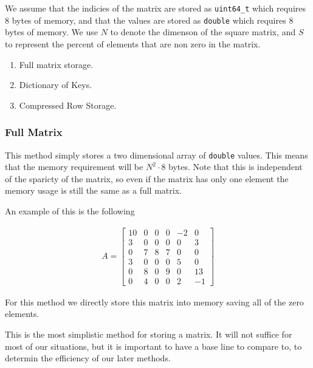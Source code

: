 \documentclass[../fem.tex]{subfiles}
\begin{document}
We assume that the indicies of the matrix are stored as
\texttt{uint64_t} which requires $8$ bytes of memory, and that the
values are stored as \texttt{double} which requires $8$ bytes of
memory. We use $N$ to denote the dimenson of the square matrix, and $S$ to
represent the percent of elements that are non zero in the matrix.

\begin{enumerate}[label=\arabic*.]
  \item Full matrix storage.
  \item Dictionary of Keys.
  \item Compressed Row Storage.
\end{enumerate}

\subsubsection{Full Matrix}%
\label{ssub:full_matrix}

This method simply stores a two dimensional array of \texttt{double}
values. This means that the memory requirement will be $N^2\cdot 8$ bytes. Note
that this is independent of the sparicty of the matrix, so even if the matrix
has only one element the memory usage is still the same as a full matrix.

An example of this is the following

\begin{align*}
   A = \begin{bmatrix}
     10 & 0 & 0 & 0 & -2 & 0 \\
     3 & 0 & 0 & 0 & 0 & 3 \\
     0 & 7 & 8 & 7 & 0 & 0 \\
     3 & 0 & 0 & 0 & 5 & 0 \\
     0 & 8 & 0 & 9 & 0 & 13 \\
     0 & 4 & 0 & 0 & 2 & -1
   \end{bmatrix}
\end{align*}

For this method we directly store this matrix into memory saving all of the
zero elements.

This is the most simplistic method for storing a matrix. It will not suffice
for most of our situations, but it is important to have a base line to compare
to, to determin the efficiency of our later methods.

\begin{Figure}
  \begin{center}
  \end{center}
  \label{fig:mat_full}
\end{Figure}
\end{document}

